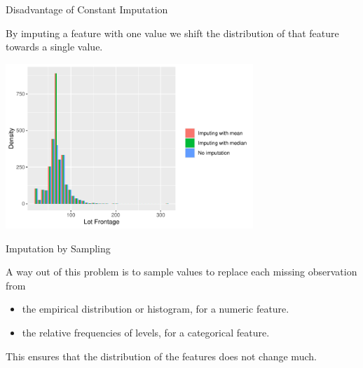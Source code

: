 \documentclass[11pt,compress,t,notes=noshow, xcolor=table]{beamer}
\begin{document}
\begin{frame}{Disadvantage of Constant Imputation}

    By imputing a feature with one value we shift the distribution of that feature towards a single value.
    
    \begin{center}
        \includegraphics[width=0.7\textwidth]{figure/imputation_distribution_comparison}
    \end{center}

\end{frame}

\begin{frame}{Imputation by Sampling}

    A way out of this problem is to sample values to replace each missing observation from
    
    \begin{itemize}
        \item the empirical distribution or histogram, for a numeric feature.
        \item the relative frequencies of levels, for a categorical feature.
    \end{itemize}
    
    This ensures that the distribution of the features does not change much.

\end{frame}
\end{document}
